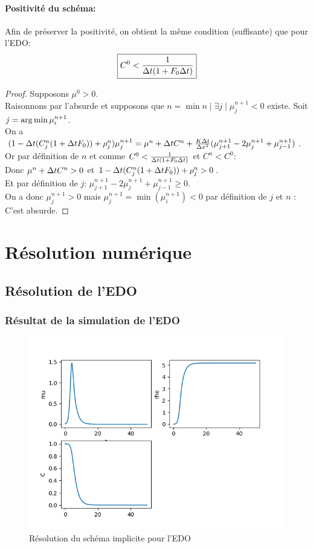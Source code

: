 \documentclass[11pt]{article}
\begin{document}
\paragraph{Positivité du schéma:}
Afin de préserver la positivité, on obtient la même condition (suffisante) que pour l'EDO:
\begin{equation}
	\boxed{C^0< \frac{1}{\Delta t(1+F_0\Delta t)}}
\end{equation}
\begin{proof} Supposons $\mu^0 >0$.\\ Raisonnons par l'absurde et supposons que $n=\min{n \mid \exists j \mid \mu^{n+1}_j < 0}$ existe. Soit $j = \operatorname*{arg\,min}{\mu^{n+1}_i}$.\\
On a $(1-\Delta t(C^{n}_j(1+\Delta t F_0)) + \rho^{n}_j)\mu^{n+1}_j = \mu^{n}+  \Delta t C^{n} +\frac{K\Delta t}{\Delta x^2}(\mu^{n+1}_{j+1} - 2\mu^{n+1}_j + \mu^{n+1}_{j-1}) $. \\
Or par définition de $n$ et comme $C^0< \frac{1}{\Delta t(1+F_0\Delta t)}$ et $C^n < C^0$:\\
 Donc $ \mu^{n}+  \Delta t C^{n} > 0$ et
 $ 1-\Delta t(C^{n}_j(1+\Delta t F_0)) + \rho^{n}_j > 0$. \\
Et par définition de $j$: 
$\mu^{n+1}_{j+1} - 2\mu^{n+1}_j + \mu^{n+1}_{j-1} \geq 0$.\\
On a donc $\mu^{n+1}_j > 0$ mais   $\mu^{n+1}_j = \min(\mu^{n+1}_i) < 0$ par définition de $j$ et $n$ : C'est absurde.
\end{proof}

\newpage
\section{Résolution numérique}
\subsection{Résolution de l'EDO}
\subsubsection{Résultat de la simulation de l'EDO}
\begin{figure}[hbt!]
\centering
\includegraphics[width=.9\textwidth]{Images/edo_euler_implicite.png}
\caption{Résolution du schéma implicite pour l'EDO}
\end{figure}
\end{document}
